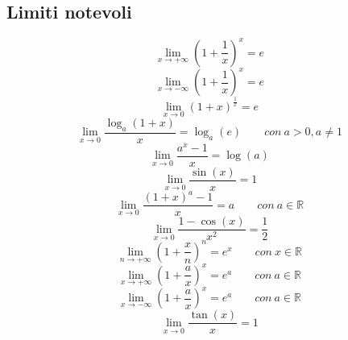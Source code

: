\documentclass{article}
\begin{document}
\subsection{Limiti notevoli}
\begin{equation}
    \lim_{x \to +\infty} \left(1 + \frac{1}{x}\right)^x = e
    \label{eq:limnot1}
\end{equation}
\begin{equation}
    \lim_{x \to -\infty} \left(1 + \frac{1}{x}\right)^x = e
    \label{eq:limnot2}
\end{equation}
\begin{equation}
    \lim_{x \to 0} (1 + x)^\frac{1}{x} = e
    \label{eq:limnot3}
\end{equation}
\begin{equation}
    \lim_{x \to 0} \frac{\log_a(1 +x)}{x} = \log_a(e) \qquad con \ a > 0, a \neq 1
    \label{eq:limnot4}
\end{equation}
\begin{equation}
    \lim_{x \to 0} \frac{a^x - 1}{x} = \log(a)
    \label{eq:limnot5}
\end{equation}
\begin{equation}
    \lim_{x \to 0} \frac{\sin(x)}{x} = 1
    \label{eq:limnot6}
\end{equation}
\begin{equation}
    \lim_{x \to 0} \frac{(1 + x)^a - 1}{x} = a \qquad con \ a \in \mathbb{R}
    \label{eq:limnot7}
\end{equation}
\begin{equation}
    \lim_{x \to 0} \frac{1 - \cos(x)}{x^2} = \frac{1}{2}
    \label{eq:limnot8}
\end{equation}
\begin{equation}
    \lim_{n \to +\infty} \left(1 + \frac{x}{n}\right)^n = e^x \qquad con \ x \in \mathbb{R}
    \label{eq:limnot9}
\end{equation}
\begin{equation}
    \lim_{x \to +\infty} \left(1 + \frac{a}{x}\right)^x = e^a \qquad con \ a \in \mathbb{R}
    \label{eq:limnot10}
\end{equation}
\begin{equation}
    \lim_{x \to -\infty} \left(1 + \frac{a}{x}\right)^x = e^a \qquad con \ a \in \mathbb{R}
    \label{eq:limnot11}
\end{equation}
\begin{equation}
    \lim_{x \to 0} \frac{\tan(x)}{x} = 1
    \label{eq:limnot12}
\end{equation}
\end{document}
